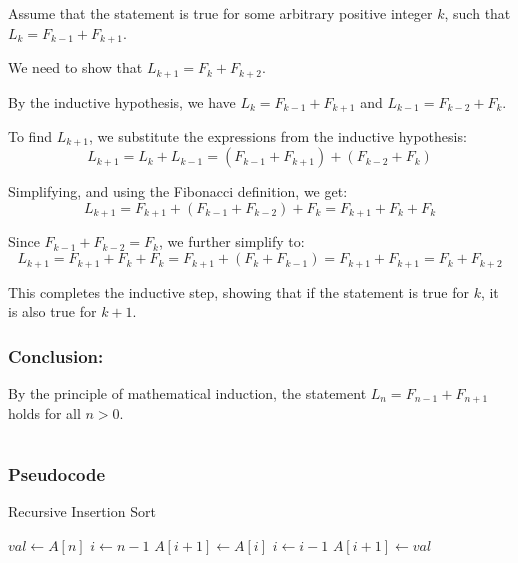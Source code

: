 \documentclass{article}
\begin{document}
Assume that the statement is true for some arbitrary positive integer \(k\), such that \(L_k = F_{k-1} + F_{k+1}\). 

We need to show that \(L_{k+1} = F_k + F_{k+2}\).

By the inductive hypothesis, we have \(L_k = F_{k-1} + F_{k+1}\) and \(L_{k-1} = F_{k-2} + F_k\).

To find \(L_{k+1}\), we substitute the expressions from the inductive hypothesis:
\[
L_{k+1} = L_k + L_{k-1} = (F_{k-1} + F_{k+1}) + (F_{k-2} + F_k)
\]

Simplifying, and using the Fibonacci definition, we get:
\[
L_{k+1} = F_{k+1} + (F_{k-1} + F_{k-2}) + F_k = F_{k+1} + F_k + F_k
\]

Since \(F_{k-1} + F_{k-2} = F_k\), we further simplify to:
\[
L_{k+1} = F_{k+1} + F_k + F_k = F_{k+1} + (F_k + F_{k-1}) = F_{k+1} + F_{k+1} = F_k + F_{k+2}
\]

This completes the inductive step, showing that if the statement is true for \(k\), it is also true for \(k+1\).

\subsubsection*{Conclusion:}
By the principle of mathematical induction, the statement \(L_n = F_{n-1} + F_{n+1}\) holds for all \(n > 0\).

\section{}

\subsubsection*{Pseudocode}

\begin{algorithm}
\caption{Recursive Insertion Sort}
\begin{algorithmic}[1]
    \State $val \gets A[n]$
    \State $i \gets n-1$
        \State $A[i+1] \gets A[i]$
        \State $i \gets i - 1$
    \EndWhile
    \State $A[i+1] \gets val$
\EndFunction
\Statex
{}
        \State {}
        \State {}
    \EndIf
\EndFunction
\end{algorithmic}
\end{algorithm}
\end{document}
